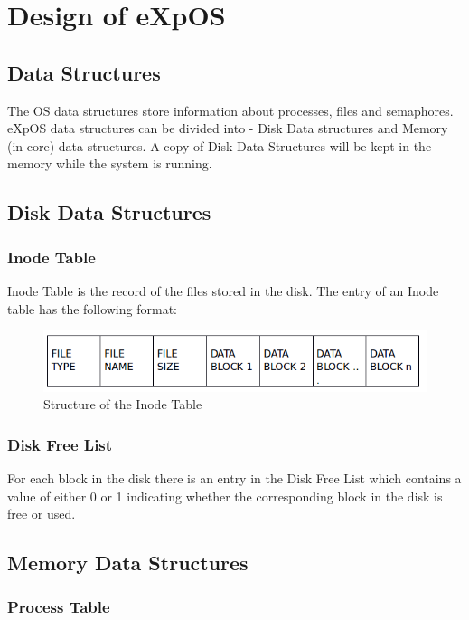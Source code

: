 \documentclass[11pt ,twosided]{article}
\begin{document}
\section{Design of eXpOS}
\subsection{Data Structures}

The OS data structures store information about processes, files and semaphores. eXpOS data structures can be divided into - Disk Data structures and Memory (in-core) data structures. A copy of Disk Data Structures will be kept in the memory while the system is running.
\subsection{Disk Data Structures}
\subsubsection{Inode Table}

Inode Table is the record of the files stored in the disk. The entry of an Inode table has the following format:
\begin{figure}[ht]
\centering
\includegraphics[scale=0.60]{Inode_table.png}
\caption{\footnotesize Structure of the Inode Table}
\label{fig_1}
\end{figure}
\subsubsection{Disk Free List}

For each block in the disk there is an entry in the Disk Free List which contains a value of either 0 or 1 indicating whether the corresponding block in the disk is free or used.
\subsection{Memory Data Structures}
\subsubsection{Process Table}
\end{document}
